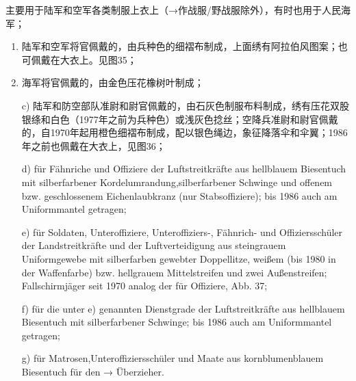 主要用于陆军和空军各类制服上衣上（→作战服/野战服除外），有时也用于人民海军；

\begin{enumerate}

    \item 陆军和空军将官佩戴的，由兵种色的细褶布制成，上面绣有阿拉伯风图案；也可佩戴在大衣上。见图35；

    \item 海军将官佩戴的，由金色压花橡树叶制成；

    c) 陆军和防空部队准尉和尉官佩戴的，由石灰色制服布料制成，绣有压花双股银绦和白色（1977年之前为兵种色）或浅灰色捻丝；空降兵准尉和尉官佩戴的，自1970年起用橙色细褶布制成，配以银色绳边，象征降落伞和伞翼；1986 年之前也佩戴在大衣上，见图36；

d) für Fähnriche und Offiziere der Luftstreitkräfte aus hellblauem Biesentuch mit silberfarbener Kordelumrandung,silberfarbener Schwinge und offenem bzw. geschlossenem Eichenlaubkranz (nur Stabsoffiziere); bis 1986 auch am Uniformmantel getragen;

e) für Soldaten, Unteroffiziere, Unteroffiziers-, Fähnrich- und Offiziersschüler der Landstreitkräfte und der Luftverteidigung aus steingrauem Uniformgewebe mit silberfarben gewebter Doppellitze, weißem (bis 1980 in der
Waffenfarbe) bzw. hellgrauem Mittelstreifen und zwei Außenstreifen; Fallschirmjäger seit 1970 analog der für Offiziere, Abb. 37;

f) für die unter e) genannten Dienstgrade der Luftstreitkräfte aus hellblauem Biesentuch mit silberfarbener Schwinge; bis 1986 auch am Uniformmantel getragen;

g) für Matrosen,Unteroffiziersschüler und Maate aus kornblumenblauem Biesentuch für den → Überzieher.

\end{enumerate}

